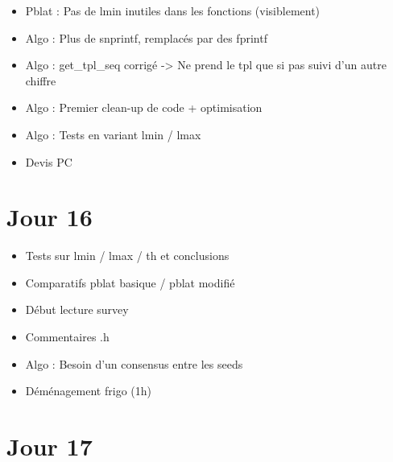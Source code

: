 \documentclass[12pt]{report}
\begin{document}
\begin{itemize}
  \item Pblat : Pas de lmin inutiles dans les fonctions (visiblement)

  \item Algo : Plus de snprintf, remplacés par des fprintf

  \item Algo : get\_tpl\_seq corrigé -> Ne prend le tpl que si pas suivi d'un autre chiffre

  \item Algo : Premier clean-up de code + optimisation

  \item Algo : Tests en variant lmin / lmax

  \item Devis PC
\end{itemize}

\section{Jour 16}

\begin{itemize}
  \item Tests sur lmin / lmax / th et conclusions

  \item Comparatifs pblat basique / pblat modifié

  \item Début lecture survey

  \item Commentaires .h

  \item  Algo : Besoin d'un consensus entre les seeds

  \item Déménagement frigo (1h)
\end{itemize}

\section{Jour 17}
\end{document}
